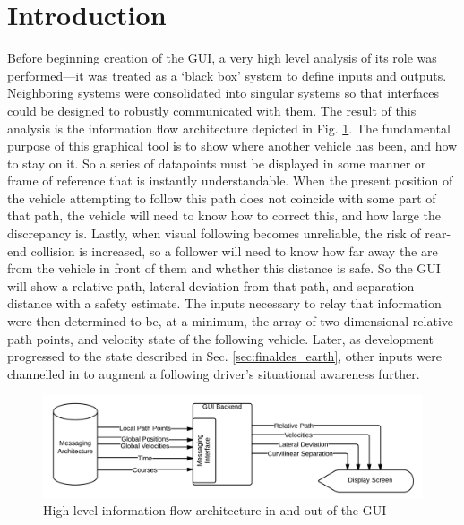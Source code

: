 \documentclass[12pt]{report}
\begin{document}
\section{Introduction} \label{sec:guiintro}

Before beginning creation of the GUI, a very high level analysis of its role was performed---it was treated as a `black box' system to define inputs and outputs. Neighboring systems were consolidated into singular systems so that interfaces could be designed to robustly communicated with them. The result of this analysis is the information flow architecture depicted in Fig. \ref{fig:blackboxflow}.
The fundamental purpose of this graphical tool is to show where another vehicle has been, and how to stay on it. So a series of datapoints must be displayed in some manner or frame of reference that is instantly understandable. When the present position of the vehicle attempting to follow this path does not coincide with some part of that path, the vehicle will need to know how to correct this, and how large the discrepancy is. Lastly, when visual following becomes unreliable, the risk of rear-end collision is increased, so a follower will need to know how far away the are from the vehicle in front of them and whether this distance is safe. So the GUI will show a relative path, lateral deviation from that path, and separation distance with a safety estimate.
The inputs necessary to relay that information were then determined to be, at a minimum, the array of two dimensional relative path points, and velocity state of the following vehicle. Later, as development progressed to the state described in Sec. \ref{sec:finaldes_earth}, other inputs were channelled in to augment a following driver's situational awareness further.

\begin{figure}[ht] \label{fig:blackboxflow} \centering
    \includegraphics[width=6.5in]{./figs/blackbox_flowchart.png}
    \caption{High level information flow architecture in and out of the GUI}
\end{figure}
\end{document}
